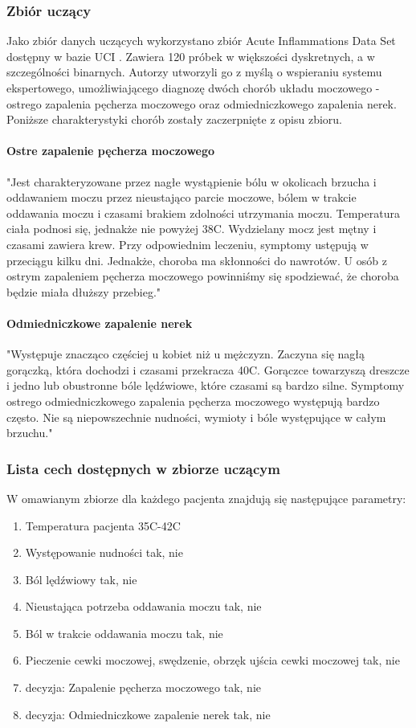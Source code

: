 \documentclass[12pt]{article}
\begin{document}
\subsubsection{Zbiór uczący}
Jako zbiór danych uczących wykorzystano zbiór Acute Inflammations Data Set dostępny w bazie UCI \cite{dataset}. Zawiera 120 próbek w większości dyskretnych, a w szczególności binarnych. Autorzy utworzyli go z myślą o wspieraniu systemu ekspertowego, umożliwiającego diagnozę dwóch chorób układu moczowego - ostrego zapalenia pęcherza moczowego oraz odmiedniczkowego zapalenia nerek. Poniższe charakterystyki chorób zostały zaczerpnięte z opisu zbioru.

\paragraph{Ostre zapalenie pęcherza moczowego}
"Jest charakteryzowane przez nagłe wystąpienie bólu w okolicach brzucha i oddawaniem moczu przez nieustająco parcie moczowe, bólem w trakcie oddawania moczu i czasami brakiem zdolności utrzymania moczu. Temperatura ciała podnosi się, jednakże nie powyżej 38C. Wydzielany mocz jest mętny i czasami zawiera krew. Przy odpowiednim leczeniu, symptomy ustępują w przeciągu kilku dni. Jednakże, choroba ma skłonności do nawrotów. U osób z ostrym zapaleniem pęcherza moczowego powinniśmy się spodziewać, że choroba będzie miała dłuższy przebieg."

\paragraph{Odmiedniczkowe zapalenie nerek}
"Występuje znacząco częściej u kobiet niż u mężczyzn. Zaczyna się nagłą gorączką, która dochodzi i czasami przekracza 40C. Gorączce towarzyszą dreszcze i jedno lub obustronne bóle lędźwiowe, które czasami są bardzo silne. Symptomy ostrego odmiedniczkowego zapalenia pęcherza moczowego występują bardzo często. Nie są niepowszechnie nudności, wymioty i bóle występujące w całym brzuchu."

\subsubsection{Lista cech dostępnych w zbiorze uczącym}

W omawianym zbiorze dla każdego pacjenta znajdują się następujące parametry:

\begin{enumerate}
	\item Temperatura pacjenta 35C-42C
	\item Występowanie nudności tak, nie
	\item Ból lędźwiowy tak, nie
	\item Nieustająca potrzeba oddawania moczu tak, nie
	\item Ból w trakcie oddawania moczu tak, nie
	\item Pieczenie cewki moczowej, swędzenie, obrzęk ujścia cewki moczowej tak, nie
	\item decyzja: Zapalenie pęcherza moczowego tak, nie
	\item decyzja: Odmiedniczkowe zapalenie nerek tak, nie
\end{enumerate}
\end{document}
